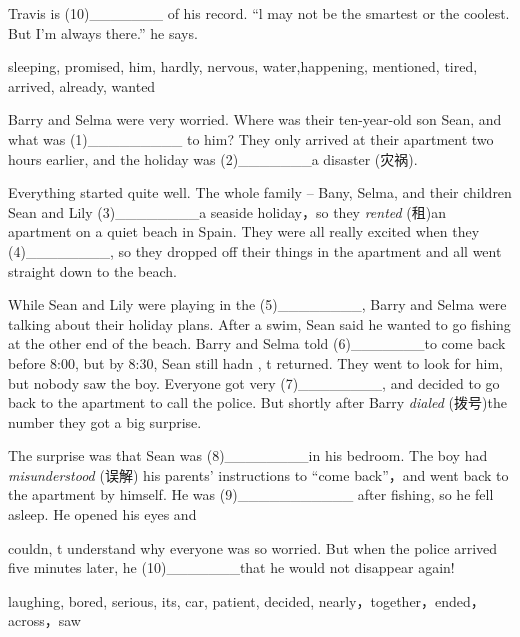 \documentclass{ctexart}
\begin{document}
Travis is (10){\_}{\_}{\_}{\_}{\_}{\_}{\_} of his record. ``l may not be the 
smartest or the coolest. But I'm always there.'' he says.

\begin{center}
sleeping, promised, him, hardly, nervous, water,happening, mentioned, tired, 
arrived, already, wanted 
\end{center}

Barry and Selma were very worried. Where was their ten-year-old son Sean, 
and what was (1){\_}{\_}{\_}{\_}{\_}{\_}{\_}{\_}{\_} to him? They only 
arrived at their apartment two hours earlier, and the holiday was 
(2){\_}{\_}{\_}{\_}{\_}{\_}{\_}a disaster (灾祸).

Everything started quite well. The whole family -- Bany, Selma, and their 
children Sean and Lily (3){\_}{\_}{\_}{\_}{\_}{\_}{\_}{\_}a seaside 
holiday，so they \textit{rented} (租)an apartment on a quiet beach in Spain. They were all 
really excited when they (4){\_}{\_}{\_}{\_}{\_}{\_}{\_}{\_}, so they 
dropped off their things in the apartment and all went straight down to the 
beach.

While Sean and Lily were playing in the (5){\_}{\_}{\_}{\_}{\_}{\_}{\_}{\_}, 
Barry and Selma were talking about their holiday plans. After a swim, Sean 
said he wanted to go fishing at the other end of the beach. Barry and Selma 
told (6){\_}{\_}{\_}{\_}{\_}{\_}{\_}to come back before 8:00, but by 8:30, 
Sean still hadn , t returned. They went to look for him, but nobody saw the 
boy. Everyone got very (7){\_}{\_}{\_}{\_}{\_}{\_}{\_}{\_}, and decided to 
go back to the apartment to call the police. But shortly after Barry 
\textit{dialed} (拨号)the number they got a big surprise.

The surprise was that Sean was (8){\_}{\_}{\_}{\_}{\_}{\_}{\_}{\_}in his 
bedroom. The boy had \textit{misunderstood} (误解) his parents' instructions to ``come back''，and 
went back to the apartment by himself. He was 
(9){\_}{\_}{\_}{\_}{\_}{\_}{\_}{\_}{\_}{\_}{\_} after fishing, so he fell 
asleep. He opened his eyes and

couldn, t understand why everyone was so worried. But when the police 
arrived five minutes later, he (10){\_}{\_}{\_}{\_}{\_}{\_}{\_}that he would 
not disappear again!

\begin{center}
laughing, bored, serious, its, car, patient, decided, 
nearly，together，ended，across，saw 
\end{center}
\end{document}
